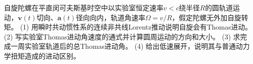 自旋陀螺在平直闵可夫斯基时空中以实验室恒定速率\(v<c\)绕半径\(R\)的圆轨道运动，\(\boldsymbol v(t)\)切向、\(\boldsymbol a(t)\)径向向内，轨道角速率\(\Omega=v/R\)，假定陀螺无外加自旋转矩。
(1) 用瞬时共动惯性系的连续非共线Lorentz推动说明自旋会有Thomas进动。
(2) 写实验室Thomas进动角速度的通式并计算圆周运动的方向和大小。
(3) 求完成一周实验室轨道后的总Thomas进动角。
(4) 给出低速展开，说明其与普通动力学扭矩造成的进动区别。
